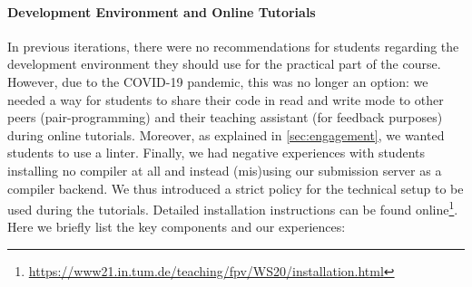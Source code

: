 \paragraph{Development Environment and Online Tutorials}
In previous iterations,
there were no recommendations for students regarding the development environment they should use for the practical part of the course.
However, due to the COVID-19 pandemic,
this was no longer an option:
we needed a way for students to share their code in read and write mode
to other peers (pair-programming) and their teaching assistant (for feedback purposes) during online tutorials.
Moreover, as explained in \cref{sec:engagement},
we wanted students to use a linter.
Finally, we had negative experiences with students
installing no compiler at all
and instead (mis)using our submission server as a compiler backend.
We thus introduced a strict policy
for the technical setup to be used during
the tutorials.
Detailed installation instructions can be found online\footnote{\url{https://www21.in.tum.de/teaching/fpv/WS20/installation.html}}.
Here we briefly list the key components and our experiences:
